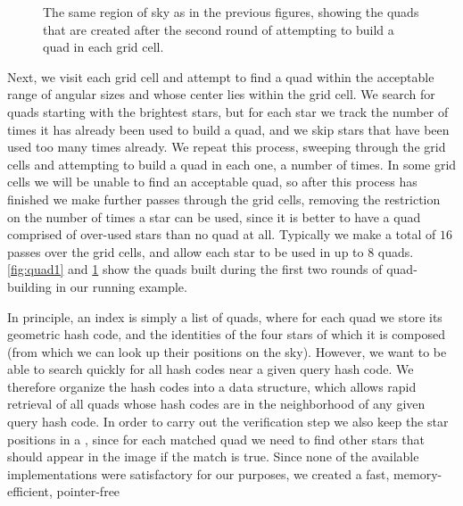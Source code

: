 
\begin{figure}[htp]
\begin{center}
\setlength{\fboxsep}{0.5pt}
\end{center}
\caption{The same region of sky as in the previous figures, showing the
quads that are created after the second round of attempting to build a
quad in each grid cell.
\label{fig:quad2}}
\end{figure}


Next, we visit each grid cell and attempt to find a quad within the
acceptable range of angular sizes and whose center lies within the
grid cell.  We search for quads starting with the brightest stars, but
for each star we track the number of times it has already been used to
build a quad, and we skip stars that have been used too many times
already.  We repeat this process, sweeping through the grid cells and
attempting to build a quad in each one, a number of times.  In some
grid cells we will be unable to find an acceptable quad, so after this
process has finished we make further passes through the grid cells,
removing the restriction on the number of times a star can be used,
since it is better to have a quad comprised of over-used stars than no
quad at all.  Typically we make a total of $16$ passes over the grid
cells, and allow each star to be used in up to $8$ quads.  \Figs
\ref{fig:quad1} and \ref{fig:quad2} show the quads built during the first
two rounds of quad-building in our running example.


In principle, an index is simply a list of quads, where for each quad
we store its geometric hash code, and the identities of the four stars
of which it is composed (from which we can look up their positions on
the sky).  However, we want to be able to search quickly for all hash
codes near a given query hash code.  We therefore organize the hash
codes into a \kdtree data structure, which allows rapid retrieval of
all quads whose hash codes are in the neighborhood of any given query
hash code.  In order to carry out the verification step we also keep
the star positions in a \kdtree, since for each matched quad we need
to find other stars that should appear in the image if the match is
true.  Since none of the available \kdtree implementations were
satisfactory for our purposes, we created a fast, memory-efficient,
pointer-free \kdtree
{}
%


